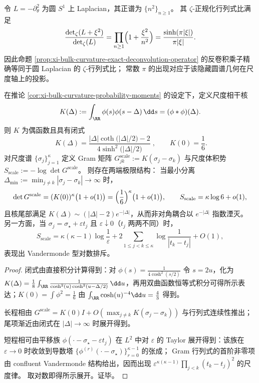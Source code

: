 \begin{remark}\label{rem:xi-bulk-curvature-circle-zeta-determinant}
令 \(L=-\partial_\theta^2\) 为圆 \(S^1\) 上 Laplacian，其正谱为 \(\{n^2\}_{n\ge1}\)。
其 \(\zeta\)-正规化行列式比满足
\[
\frac{\det_\zeta(L+\xi^{2})}{\det_\zeta(L)}
=\prod_{n\ge1}\Bigl(1+\frac{\xi^{2}}{n^{2}}\Bigr)
=\frac{\sinh(\pi|\xi|)}{\pi|\xi|}.
\]
因此命题 \ref{prop:xi-bulk-curvature-exact-deconvolution-operator} 的反卷积乘子精确等同于圆 Laplacian 的 \(\zeta\)-行列式比；
常数 \(\pi\) 的出现对应于该隐藏圆谱几何在尺度轴上的投影。
\end{remark}

\begin{proposition}\label{prop:xi-bulk-curvature-scale-gram-two-phase}
在推论 \ref{cor:xi-bulk-curvature-probability-moments} 的设定下，定义尺度相干核
\[
K(\Delta):=\int_{\RR}\phi(s)\phi(s-\Delta)\,\dd s=(\phi*\phi)(\Delta).
\]
则 \(K\) 为偶函数且具有闭式
\[
\boxed{\;
K(\Delta)=\frac{|\Delta|\coth\!\bigl(|\Delta|/2\bigr)-2}{4\sinh^{2}\!\bigl(|\Delta|/2\bigr)}\; } ,
\qquad
K(0)=\frac{1}{6}.
\]
对尺度谱 \(\{\sigma_j\}_{j=1}^{\kappa}\) 定义 Gram 矩阵
\(
G^{\mathrm{scale}}_{jk}:=K(\sigma_j-\sigma_k)
\)
与尺度体积势
\(
S_{\mathrm{scale}}:=-\log\det G^{\mathrm{scale}}
\)。
则存在两端极限结构：
当最小分离 \(\Delta_{\min}:=\min_{j\neq k}|\sigma_j-\sigma_k|\to\infty\) 时，
\[
\det G^{\mathrm{scale}}=(K(0))^{\kappa}\bigl(1+o(1)\bigr)=\Bigl(\frac16\Bigr)^{\kappa}\bigl(1+o(1)\bigr),
\qquad
S_{\mathrm{scale}}=\kappa\log 6+o(1),
\]
且核尾部满足 \(K(\Delta)\sim (|\Delta|-2)e^{-|\Delta|}\)，从而非对角耦合以 \(e^{-|\Delta|}\) 指数湮灭。
另一方面，当 \(\sigma_j=\sigma_\star+\varepsilon t_j\) 且 \(\varepsilon\downarrow0\)（\(t_j\) 两两不同）时，
\[
S_{\mathrm{scale}}
=\kappa(\kappa-1)\log\frac{1}{\varepsilon}
+2\sum_{1\le j<k\le \kappa}\log\frac{1}{|t_k-t_j|}
+O(1),
\]
表现出 Vandermonde 型对数排斥。
\end{proposition}
\begin{proof}
闭式由直接积分计算得到：对 \(\phi(s)=\frac{1}{4\cosh^{2}(s/2)}\) 令 \(s=2u\)，化为
\(
K(\Delta)=\frac18\int_{\RR}\frac{1}{\cosh^{2}(u)\cosh^{2}(u-\Delta/2)}\,\dd u
\)，再用双曲函数恒等式积分可得所示表达；\(K(0)=\int \phi^2=\frac16\) 由 \(\int_{\RR}\cosh(u)^{-4}\dd u=\frac43\) 得到。
\par
长程相由 \(G^{\mathrm{scale}}=K(0)I+O(\max_{j\neq k}K(\sigma_j-\sigma_k))\) 与行列式连续性推出；尾项渐近由闭式在 \(|\Delta|\to\infty\) 时展开得到。
\par
短程相可由平移族 \(\phi(\cdot-\sigma_\star-\varepsilon t_j)\) 在 \(L^2\) 中对 \(\varepsilon\) 的 Taylor 展开得到：该族在 \(\varepsilon\to0\) 时收敛到导数塔 \(\{\phi^{(r)}(\cdot-\sigma_\star)\}_{r=0}^{\kappa-1}\) 的张成；
Gram 行列式的首阶非零项由 confluent Vandermonde 结构给出，因而出现 \(\varepsilon^{\kappa(\kappa-1)}\prod_{j<k}(t_k-t_j)^2\) 的尺度律。
取对数即得所示展开。证毕。
\end{proof}

